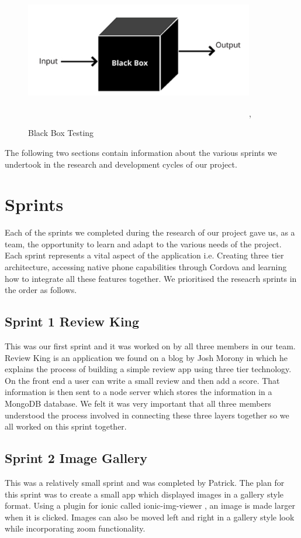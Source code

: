 \begin{figure}[h]
\centering
\includegraphics[width=10cm, height=6cm]{img/black_box.PNG},
\caption{Black Box Testing}
\label{black_box}
\end{figure} 


\noindent The following two sections contain information about the various sprints we undertook in the research and development cycles of our project.

\section{Sprints} \label{reseacrh_sprints}
Each of the sprints we completed during the research of our project gave us, as a team, the opportunity to learn and adapt to the various needs of the project. Each sprint represents a vital aspect of the application i.e. Creating three tier architecture, accessing native phone capabilities through Cordova and learning how to integrate all these features together. We prioritised the reseacrh sprints in the order as follows.

\subsection{Sprint 1 Review King}
This was our first sprint and it was worked on by all three members in our team. Review King is an application we found on a blog by Josh Morony \cite{ReviewKing} in which he explains the process of building a simple review app using three tier technology. On the front end a user can write a small review and then add a score. That information is then sent to a node server which stores the information in a MongoDB database. We felt it was very important that all three members understood the process involved in connecting these three layers together so we all worked on this sprint together.   

\subsection{Sprint 2 Image Gallery}
This was a relatively small sprint and was completed by Patrick. The plan for this sprint was to create a small app which displayed images in a gallery style format. Using a plugin for ionic called ionic-img-viewer \cite{ImgViwer}, an image is made larger when it is clicked. Images can also be moved left and right in a gallery style look while incorporating zoom functionality. 

